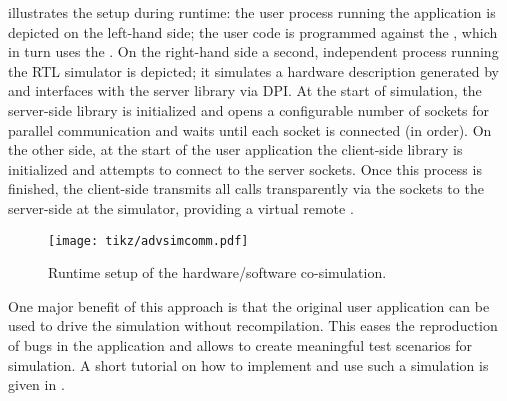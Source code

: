 \medskip
{} illustrates the setup during runtime:
the user process running the application is depicted on the left-hand side; the user code is programmed against the , which in turn uses the . 
On the right-hand side a second, independent process running the RTL simulator is depicted; it simulates a hardware description generated by \tapasco{} and interfaces with the server library via DPI.
At the start of simulation, the server-side library is initialized and opens a configurable number of sockets for parallel communication and waits until each socket is connected (in order).
On the other side, at the start of the user application the client-side library is initialized and attempts to connect to the server sockets.
Once this process is finished, the client-side transmits all  calls transparently via the sockets to the server-side at the simulator, providing a virtual remote .
%
\begin{figure}
  \centering%
  \texttt{[image: tikz/advsimcomm.pdf]}
  \caption{Runtime setup of the hardware/software co-simulation.}
  \label{fig:dpi-sim}
\end{figure}

\medskip
One major benefit of this approach is that the original user application can be used to drive the simulation without recompilation.
This eases the reproduction of bugs in the application and allows to create meaningful test scenarios for simulation.
A short tutorial on how to implement and use such a simulation is given in .

